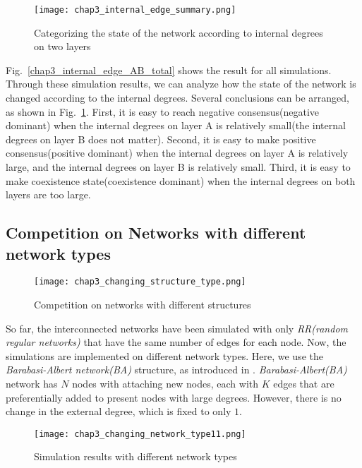 \begin{figure}[!htb]
	\centering
	\texttt{[image: chap3\_internal\_edge\_summary.png]}
	\caption{Categorizing the state of the network according to internal degrees on two layers}
	\label{chap3_internal_edge_summary}
\end{figure}

Fig.~\ref{chap3_internal_edge_AB_total} shows the result for all simulations. Through these simulation results, we can analyze how the state of the network is changed according to the internal degrees. Several conclusions can be arranged, as shown in Fig.~\ref{chap3_internal_edge_summary}.  First, it is easy to reach negative consensus(negative dominant) when the internal degrees on layer A is relatively small(the internal degrees on layer B does not matter). Second, it is easy to make positive consensus(positive dominant) when the internal degrees on layer A is relatively large, and the internal degrees on layer B is relatively small. Third, it is easy to make coexistence state(coexistence dominant) when the internal degrees on both layers are too large. \\ 


\subsection{Competition on Networks with different network types}

\begin{figure}[!htb]
	\centering
	\texttt{[image: chap3\_changing\_structure\_type.png]}
	\caption{Competition on networks with different structures}
	\label{chap3_changing_structure_type}
\end{figure}

So far, the interconnected networks have been simulated with only \textit{RR(random regular networks)} that have the same number of edges for each node. Now, the simulations are implemented on different network types. Here, we use the \textit{Barabasi-Albert network(BA)} structure, as introduced in \parencite{barabasi1999}. \textit{Barabasi-Albert(BA)} network has $N$ nodes with attaching new nodes, each with $K$ edges that are preferentially added to present nodes with large degrees. However, there is no change in the external degree, which is fixed to only $1$.

\begin{figure}[!htb]
	\centering
	\texttt{[image: chap3\_changing\_network\_type11.png]}
	\caption{Simulation results with different network types}
	\label{chap3_changing_network_type1}
\end{figure}


